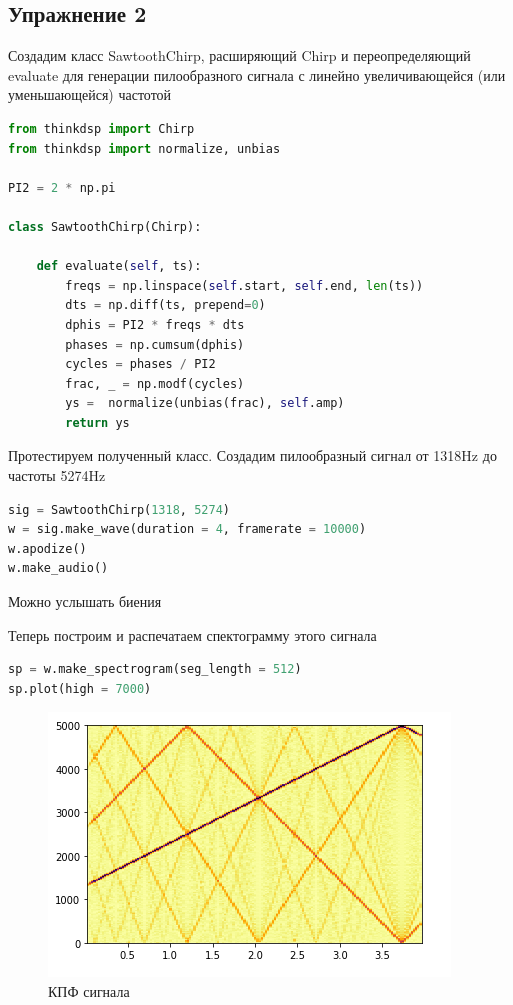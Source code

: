 \subsection{Упражнение 2}


Создадим класс SawtoothChirp, расширяющий Chirp и переопределяющий evaluate для генерации пилообразного сигнала с линейно увеличивающейся (или уменьшающейся) частотой

\begin{lstlisting}[language=Python]
from thinkdsp import Chirp
from thinkdsp import normalize, unbias

PI2 = 2 * np.pi

class SawtoothChirp(Chirp):

    def evaluate(self, ts):
        freqs = np.linspace(self.start, self.end, len(ts))
        dts = np.diff(ts, prepend=0)
        dphis = PI2 * freqs * dts
        phases = np.cumsum(dphis)
        cycles = phases / PI2
        frac, _ = np.modf(cycles)
        ys =  normalize(unbias(frac), self.amp)
        return ys
\end{lstlisting}

Протестируем полученный класс. Создадим пилообразный сигнал от 1318Hz до частоты 5274Hz

\begin{lstlisting}[language=Python]
sig = SawtoothChirp(1318, 5274)
w = sig.make_wave(duration = 4, framerate = 10000)
w.apodize()
w.make_audio()
\end{lstlisting}

Можно услышать биения

Теперь построим и распечатаем спектограмму этого сигнала

\begin{lstlisting}[language=Python]
sp = w.make_spectrogram(seg_length = 512)
sp.plot(high = 7000)
\end{lstlisting}

\begin{figure}[H]
	\begin{center}
		\includegraphics[scale=1]{fig/lab03/lab03_10.png}
		\caption{КПФ сигнала}
	\end{center}
\end{figure}


